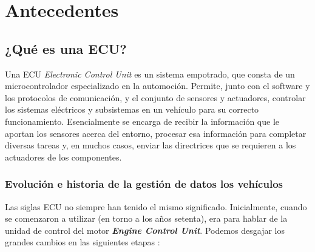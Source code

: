 \chapter{Antecedentes}


\noindent{}

\section{¿Qué es una ECU?}


Una ECU \textit{Electronic Control Unit} es un sistema empotrado, que consta de un microcontrolador especializado en la automoción. \cite{ecutesting_ecu} Permite, junto con el software y los protocolos de comunicación, y el conjunto de sensores y actuadores, controlar los sistemas eléctricos y subsistemas en un vehículo para su correcto funcionamiento. 
Esencialmente se encarga de recibir la información que le aportan los sensores acerca del entorno, procesar esa información para completar diversas tareas y, en muchos casos, enviar las directrices que se requieren a los actuadores de los componentes.\newline




\subsection{Evolución e historia de la gestión de datos los vehículos}

Las siglas ECU no siempre han tenido el mismo significado. Inicialmente, cuando se comenzaron a utilizar (en torno a los años setenta), era para hablar de la unidad de control del motor \textit{\textbf{Engine Control Unit}}. Podemos desgajar los grandes cambios en las siguientes etapas \cite{motortrend_ecu}:

